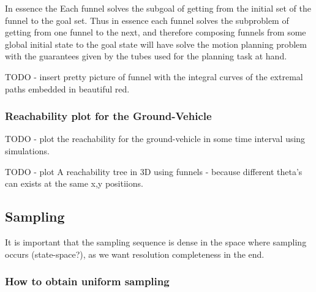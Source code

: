 In essence the Each funnel solves the subgoal of getting from the initial set of
the funnel to the goal set. Thus in essence each funnel solves the subproblem of
getting from one funnel to the next, and therefore composing funnels from some
global initial state to the goal state will have solve the motion planning
problem with the guarantees given by the tubes used for the planning task at
hand.

TODO - insert pretty picture of funnel with the integral curves of the extremal
paths embedded in beautiful red.

\subsubsection{Reachability plot for the Ground-Vehicle}
TODO - plot the reachability for the ground-vehicle in some time interval using
simulations.

TODO - plot A reachability tree in 3D using funnels - because different theta's
can exists at the same x,y positiions.

\subsection{Sampling}
It is important that the sampling sequence is dense in the space where sampling
occurs (state-space?), as we want resolution completeness in the end.
\subsubsection{How to obtain uniform sampling}
